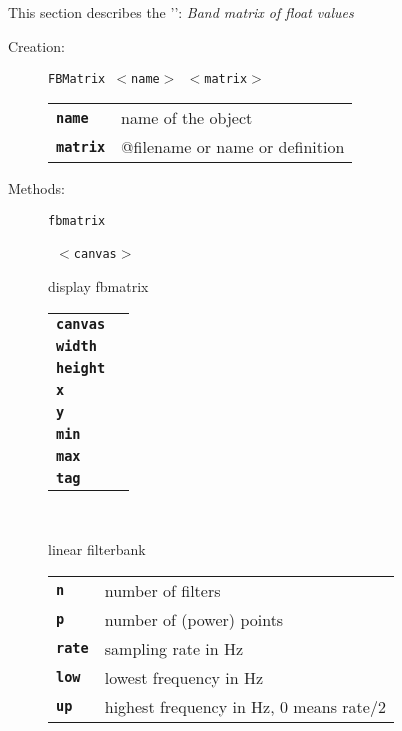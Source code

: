 
\subsection{}

This section describes the '': \textsl{Band matrix of float values}

\begin{description}

  \item[Creation:] \texttt{FBMatrix  $<$name$>$ $<$matrix$>$}


      \begin{tabular}{ll}
 \texttt{\textbf{name}} &    name of the object \\
 \texttt{\textbf{matrix}} & @filename or name or definition \\
      \end{tabular}

\vspace{3mm} \item[Methods:] \texttt{fbmatrix}

    \begin{description}
       \texttt{ $<$canvas$>$       } \

        display fbmatrix

      \begin{tabular}{ll}
 \texttt{\textbf{canvas}} &  \\
 \texttt{\textbf{width}} &     \\
 \texttt{\textbf{height}} &    \\
 \texttt{\textbf{x}} &         \\
 \texttt{\textbf{y}} &         \\
 \texttt{\textbf{min}} &       \\
 \texttt{\textbf{max}} &       \\
 \texttt{\textbf{tag}} &       \\
      \end{tabular}
       \texttt{     } \

        linear filterbank

      \begin{tabular}{ll}
 \texttt{\textbf{n}} &     number of filters  \\
 \texttt{\textbf{p}} &     number of (power) points  \\
 \texttt{\textbf{rate}} &  sampling rate in Hz  \\
 \texttt{\textbf{low}} &   lowest frequency in Hz  \\
 \texttt{\textbf{up}} &    highest frequency in Hz, 0 means rate/2  \\
      \end{tabular}
       \texttt{     } \


\end{description}
\end{description}
